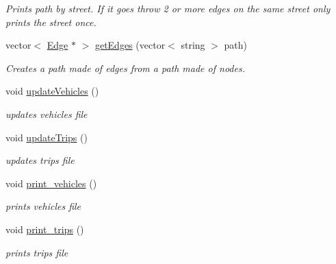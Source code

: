 \begin{DoxyCompactItemize}
\begin{DoxyCompactList}\small\item\em Prints path by street. If it goes throw 2 or more edges on the same street only prints the street once. \end{DoxyCompactList}\item 
vector$<$ \mbox{\hyperlink{class_edge}{Edge}} $\ast$ $>$ \mbox{\hyperlink{class_management_a25150de3fee6dc27f4450ff4f1d79ef7}{get\+Edges}} (vector$<$ string $>$ path)
\begin{DoxyCompactList}\small\item\em Creates a path made of edges from a path made of nodes. \end{DoxyCompactList}\item 
\mbox{\label{class_management_a899531b6cdaa77205d03cc970f4b5381}} 
void \mbox{\hyperlink{class_management_a899531b6cdaa77205d03cc970f4b5381}{update\+Vehicles}} ()
\begin{DoxyCompactList}\small\item\em updates vehicles file \end{DoxyCompactList}\item 
\mbox{\label{class_management_a8ee5ea4b7f4ef6d9281e2576f365d8ab}} 
void \mbox{\hyperlink{class_management_a8ee5ea4b7f4ef6d9281e2576f365d8ab}{update\+Trips}} ()
\begin{DoxyCompactList}\small\item\em updates trips file \end{DoxyCompactList}\item 
\mbox{\label{class_management_a215f5ae2169b645b4acf302f523a8e93}} 
void \mbox{\hyperlink{class_management_a215f5ae2169b645b4acf302f523a8e93}{print\+\_\+vehicles}} ()
\begin{DoxyCompactList}\small\item\em prints vehicles file \end{DoxyCompactList}\item 
\mbox{\label{class_management_ae8dc129529a164689937dd079087717b}} 
void \mbox{\hyperlink{class_management_ae8dc129529a164689937dd079087717b}{print\+\_\+trips}} ()
\begin{DoxyCompactList}\small\item\em prints trips file \end{DoxyCompactList}\end{DoxyCompactItemize}



